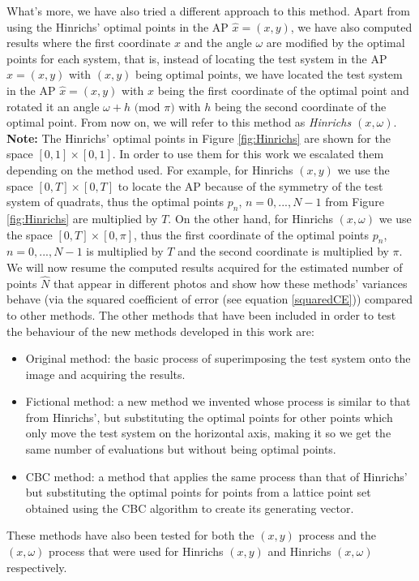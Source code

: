 What's more, we have also tried a different approach to this method. Apart from using the Hinrichs' optimal points in the AP $\widehat{x}=(x,y)$, we have also computed results where the first coordinate $x$ and the angle $\omega$ are modified by the optimal points for each system, that is, instead of locating the test system in the AP $\widehat{x}=(x,y)$ with $(x,y)$ being optimal points, we have located the test system in the AP $\widehat{x}=(x,y)$ with $x$ being the first coordinate of the optimal point and rotated it an angle $\omega + h \text{ (mod $\pi$)}$ with $h$ being the second coordinate of the optimal point. From now on, we will refer to this method as \textit{Hinrichs $(x,\omega)$}. \\

\textbf{Note:} The Hinrichs' optimal points in Figure \ref{fig:Hinrichs} are shown for the space $[0,1]\times[0,1]$. In order to use them for this work we escalated them depending on the method used. For example, for Hinrichs $(x,y)$ we use the space $[0,T]\times[0,T]$ to locate the AP because of the symmetry of the test system of quadrats, thus the optimal points $p_n$, $n=0,...,N-1$ from Figure \ref{fig:Hinrichs} are multiplied by $T$. On the other hand, for Hinrichs $(x,\omega)$ we use the space $[0,T]\times[0,\pi]$, thus the first coordinate of the optimal points $p_n$, $n=0,...,N-1$ is multiplied by $T$ and the second coordinate is multiplied by $\pi$.\\
    

We will now resume the computed results acquired for the estimated number of points $\widehat{N}$ that appear in different photos and show how these methods' variances behave (via the squared coefficient of error (see equation \eqref{squaredCE})) compared to other methods. The other methods that have been included in order to test the behaviour of the new methods developed in this work are:
\begin{itemize}
    \item Original method: the basic process of superimposing the test system onto the image and acquiring the results.
    \item Fictional method: a new method we invented whose process is similar to that from Hinrichs', but substituting the optimal points for other points which only move the test system on the horizontal axis, making it so we get the same number of evaluations but without being optimal points.
    \item CBC method: a method that applies the same process than that of Hinrichs' but substituting the optimal points for points from a lattice point set obtained using the CBC algorithm to create its generating vector.
\end{itemize}
These methods have also been tested for both the $(x,y)$ process and the $(x,\omega)$ process that were used for Hinrichs $(x,y)$ and Hinrichs $(x,\omega)$ respectively.\\

